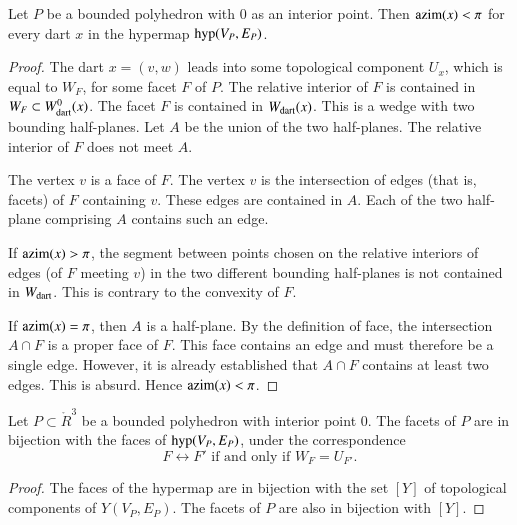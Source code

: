 \begin{lemma} Let $P$ be a bounded polyhedron with $0$ as an interior point.  Then ${\operatorname{azim}}(x) < \pi$  for every dart $x$ in the hypermap ${\operatorname{hyp}}(V_P,E_P)$.
\end{lemma}

\begin{proof}   The dart $x=(v,w)$ leads into some topological component $U_x$, which is equal to $W_F$, for some facet $F$ of $P$.  The relative interior of $F$ is contained in $W_F\subset W^0_{\text{dart}}(x)$.  The facet $F$ is contained in $W_{\text{dart}}(x)$. This is a wedge with two bounding half-planes.  Let $A$ be the union of the two half-planes.   The relative interior of $F$ does not meet $A$.   

The vertex $v$ is a face of $F$.  The vertex $v$ is the intersection of edges (that is, facets) of $F$ containing $v$.  These edges are contained in $A$.  Each of the two half-plane comprising $A$ contains such an edge. 

If ${\operatorname{azim}}(x)>\pi$, the segment between points chosen on the relative interiors of edges (of $F$ meeting $v$) in the two different bounding half-planes is not contained in $W_{\text{dart}}$.  This is contrary to the convexity of $F$.

If ${\operatorname{azim}}(x)=\pi$, then $A$ is a half-plane.  By the definition of face, the intersection $A\cap F$ is a proper face of $F$.  This face contains an edge and must therefore be a single edge.  However, it is already established that $A\cap F$ contains at least two edges.  This is absurd.  Hence ${\operatorname{azim}}(x)<\pi$.
\end{proof}


\begin{lemma}
Let $P\subset\ring{R}^3$ be a bounded polyhedron with interior point $0$.  The
facets of $P$ are in bijection with the faces of ${\operatorname{hyp}}(V_P,E_P)$, under the
correspondence
$$
F\leftrightarrow F' \text{ if and only if } W_F = U_{F'}.
$$
\end{lemma}

\begin{proof}  The faces of the hypermap are in bijection with the set $[Y]$ of topological components of $Y(V_P,E_P)$.  The facets of $P$ are also in bijection with $[Y]$.
\end{proof}